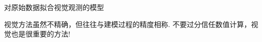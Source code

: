 \documentclass[mathserif]{beamer}
\begin{document}
\begin{frame}{对原始数据拟合视觉观测的模型}
  \begin{figure}
    \centering
    \setcounter{subfigure}{0}{}
  \end{figure}

  视觉方法虽然不精确，但往往与建模过程的精度相称. 不要过分信任数值计算，视觉也是很重要的方法!

\end{frame}
\end{document}

